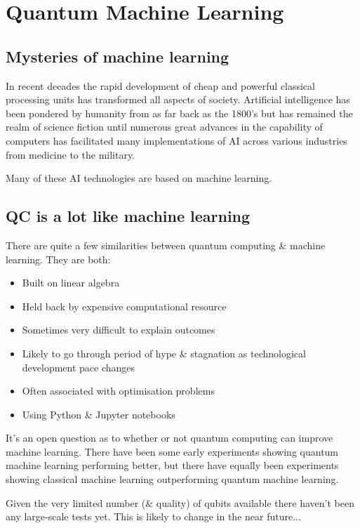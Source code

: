 \documentclass{book}
\begin{document}
\chapter{Quantum Machine Learning}

\section{Mysteries of machine learning}


In recent decades the rapid development of cheap and powerful classical processing units has transformed all aspects of society. Artificial intelligence has been pondered by humanity from as far back as the 1800's but has remained the realm of science fiction until numerous great advances in the capability of computers has facilitated many implementations of AI across various industries from medicine to the military. 

Many of these AI technologies are based on machine learning. 

\section{QC is a lot like machine learning}

There are quite a few similarities between quantum computing \& machine learning. They are both:

\begin{itemize}
    \item Built on linear algebra
    \item Held back by expensive computational resource
    \item Sometimes very difficult to explain outcomes 
    \item Likely to go through period of hype \& stagnation as technological development pace changes
    \item Often associated with optimisation problems 
    \item Using Python \& Jupyter notebooks 
\end{itemize}


It's an open question as to whether or not quantum computing can improve machine learning. There have been some early experiments showing quantum machine learning performing better, but there have equally been experiments showing classical machine learning outperforming quantum machine learning. 

 Given the very limited number (& quality) of qubits available there haven't been any large-scale tests yet. This is likely to change in the near future...
\end{document}

